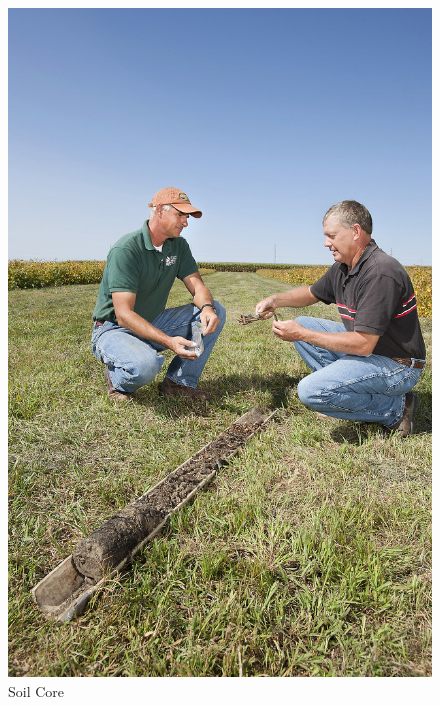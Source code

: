 \documentclass[xcolor=dvipsnames,envcountsect]{beamer}
\begin{document}
\begin{frame}
    \begin{figure}
        \centering
        \begin{minipage}[b]{0.3\linewidth}
            \centering
            \includegraphics[clip, trim={0 0 0 4\linewidth}, width=\linewidth]{Figures/soil_core.jpg}
            \caption{Soil Core}
        \end{minipage}
        \begin{minipage}[b]{0.3\linewidth}
            \centering

\end{minipage}
\end{figure}
\end{frame}
\end{document}
